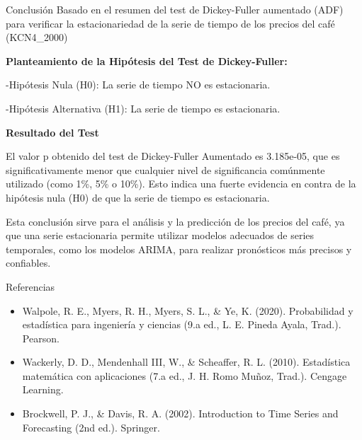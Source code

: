 \documentclass[
  10pt,
  ignorenonframetext,
  aspectratio=1612]{beamer}
\begin{document}
\begin{frame}{Conclusión}
\label{conclusiuxf3n}
Basado en el resumen del test de Dickey-Fuller aumentado (ADF) para
verificar la estacionariedad de la serie de tiempo de los precios del
café (KCN4\_2000)

\textbf{Planteamiento de la Hipótesis del Test de Dickey-Fuller:}

-Hipótesis Nula (H0): La serie de tiempo NO es estacionaria.

-Hipótesis Alternativa (H1): La serie de tiempo es estacionaria.

\textbf{Resultado del Test}

El valor p obtenido del test de Dickey-Fuller Aumentado es 3.185e-05,
que es significativamente menor que cualquier nivel de significancia
comúnmente utilizado (como 1\%, 5\% o 10\%). Esto indica una fuerte
evidencia en contra de la hipótesis nula (H0) de que la serie de tiempo
es estacionaria.

Esta conclusión sirve para el análisis y la predicción de los precios
del café, ya que una serie estacionaria permite utilizar modelos
adecuados de series temporales, como los modelos ARIMA, para realizar
pronósticos más precisos y confiables.
\end{frame}

\begin{frame}{Referencias}
\label{referencias}
\begin{itemize}
\item
  Walpole, R. E., Myers, R. H., Myers, S. L., \& Ye, K. (2020).
  Probabilidad y estadística para ingeniería y ciencias (9.a ed., L. E.
  Pineda Ayala, Trad.). Pearson.
\item
  Wackerly, D. D., Mendenhall III, W., \& Scheaffer, R. L. (2010).
  Estadística matemática con aplicaciones (7.a ed., J. H. Romo Muñoz,
  Trad.). Cengage Learning.
\item
  Brockwell, P. J., \& Davis, R. A. (2002). Introduction to Time Series
  and Forecasting (2nd ed.). Springer.
\end{itemize}
\end{frame}
\end{document}
